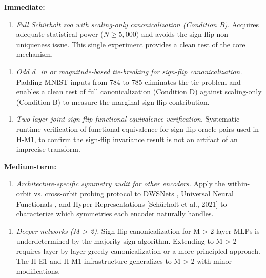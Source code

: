 \textbf{Immediate:}

\begin{enumerate}
\item \textit{Full Schürholt zoo with scaling-only canonicalization (Condition B).} Acquires adequate statistical power ($N\geq 5,000)$ and avoids the sign-flip non-uniqueness issue. This single experiment provides a clean test of the core mechanism.
\end{enumerate}

\begin{enumerate}
\item \textit{Odd d\_in or magnitude-based tie-breaking for sign-flip canonicalization.} Padding MNIST inputs from 784 to 785 eliminates the tie problem and enables a clean test of full canonicalization (Condition D) against scaling-only (Condition B) to measure the marginal sign-flip contribution.
\end{enumerate}

\begin{enumerate}
\item \textit{Two-layer joint sign-flip functional equivalence verification.} Systematic runtime verification of functional equivalence for sign-flip oracle pairs used in H-M1, to confirm the sign-flip invariance result is not an artifact of an imprecise transform.
\end{enumerate}

\textbf{Medium-term:}

\begin{enumerate}
\item \textit{Architecture-specific symmetry audit for other encoders.} Apply the within-orbit vs. cross-orbit probing protocol to DWSNets \citep{Navon2023EquivariantArchitectures}, Universal Neural Functionals \citep{Kofinas2024UniversalNeuralFunctionals}, and Hyper-Representations [Schürholt et al., 2021] to characterize which symmetries each encoder naturally handles.
\end{enumerate}

\begin{enumerate}
\item \textit{Deeper networks (M > 2).} Sign-flip canonicalization for M > 2-layer MLPs is underdetermined by the majority-sign algorithm. Extending to M > 2 requires layer-by-layer greedy canonicalization or a more principled approach. The H-E1 and H-M1 infrastructure generalizes to M > 2 with minor modifications.
\end{enumerate}

